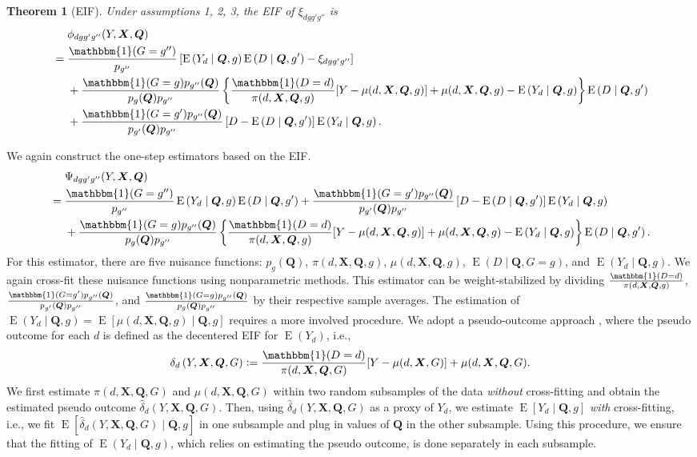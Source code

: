 \documentclass[12pt,a4paper]{article}
\newtheorem{prop}{Theorem}
\newcommand{\E}{\operatorname{E}}
\def\X{{\boldsymbol X}}
\def\Q{{\boldsymbol Q}}
\def\one{\mathbbm{1}}
\newcommand{\defeq}{\vcentcolon=}
\begin{document}
\begin{prop}[EIF]
Under assumptions 1, 2, 3, the EIF of $\xi_{dgg'g''}$ is 
\begin{align*}
     &\phantom{{}={}} \phi_{dgg'g''}(Y,\X,\Q) \\
    &=\frac{\one(G=g'')}{p_{g''}} \left[ \E \left(Y_d \mid \Q, g \right) \E \left(D \mid \Q, g' \right) - \xi_{dgg'g''} \right] \\
    &\phantom{{}={}} + \frac{\one(G=g) p_{g''}(\Q)}{p_g(\Q)p_{g''}} \left\{ \frac{\one(D=d)}{\pi(d,\X,\Q,g)} [Y-\mu(d,\X,\Q,g)]+\mu(d,\X,\Q,g) - \E \left(Y_d \mid \Q,g \right) \right\} \E \left(D \mid \Q,g' \right) \\
    &\phantom{{}={}} + \frac{\one(G=g')p_{g''}(\Q)}{p_{g'}(\Q)p_{g''}} \left[ D-\E \left(D \mid \Q, g' \right) \right] \E\left( Y_d \mid \Q, g \right).
\end{align*}
\end{prop}
We again construct the one-step estimators based on the EIF. 
\begin{align*}
    &\phantom{{}={}} \Psi_{dgg'g''}(Y,\X,\Q) \\
    &=\frac{\one(G=g'')}{p_{g''}} \E \left(Y_d \mid \Q, g \right) \E \left(D \mid \Q, g' \right) + \frac{\one(G=g')p_{g''}(\Q)}{p_{g'}(\Q)p_{g''}} \left[ D-\E \left(D \mid \Q, g' \right) \right] \E\left( Y_d \mid \Q, g \right) \\
    &\phantom{{}={}} + \frac{\one(G=g) p_{g''}(\Q)}{p_g(\Q)p_{g''}} \left\{ \frac{\one(D=d)}{\pi(d,\X,\Q,g)} [Y-\mu(d,\X,\Q,g)]+\mu(d,\X,\Q,g) - \E \left(Y_d \mid \Q,g \right) \right\} \E \left(D \mid \Q,g' \right).
\end{align*}
For this estimator, there are five nuisance functions: $p_g(\Q)$, $\pi(d,\X,\Q,g)$, $\mu(d,\X,\Q,g)$, $\E(D \mid \Q, G=g)$, and $\E(Y_d \mid \Q,g)$. We again cross-fit these nuisance functions using nonparametric methods. This estimator can be weight-stabilized by dividing $\frac{\one(D=d)}{\pi(d,\X,\Q,g)}$, $\frac{\one(G=g')p_{g''}(\Q)}{p_{g'}(\Q)p_{g''}}$, and $\frac{\one(G=g)p_{g''}(\Q)}{p_g(\Q)p_{g''}}$ by their respective sample averages. The estimation of $\E(Y_d \mid \Q,g)=\E[\mu(d,\X,\Q,g) \mid \Q,g]$ requires a more involved procedure. We adopt a pseudo-outcome approach \citep[e.g.,][]{van_der_laan_statistical_2006,semenova_debiased_2021}, where the pseudo outcome for each $d$ is defined as the decentered EIF for $\E(Y_d)$, i.e., 
$$ \delta_d \left(Y, \X, \Q, G \right) \defeq \frac{\one(D=d)}{\pi(d, \X,\Q,G)} [Y-\mu(d,\X,G)] + \mu(d,\X,\Q,G).$$
We first estimate $\pi(d, \X,\Q,G)$ and $\mu(d,\X,\Q,G)$ within two random subsamples of the data \emph{without} cross-fitting and obtain the estimated pseudo outcome $\hat{\delta}_d \left(Y, \X, \Q, G \right)$. Then, using $\hat{\delta}_d \left(Y, \X, \Q, G \right)$ as a proxy of $Y_d$, we estimate $\E\left[Y_d \mid \Q, g \right]$ \emph{with} cross-fitting, i.e., we fit $\E\left[\hat{\delta}_d \left(Y, \X, \Q, G \right) \mid \Q, g \right]$ in one subsample and plug in values of $\Q$ in the other subsample. Using this procedure, we ensure that the fitting of $\E(Y_d \mid \Q,g)$, which relies on estimating the pseudo outcome, is done separately in each subsample. 
\end{document}
